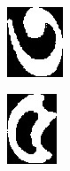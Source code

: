 \begin{figure}
\begin{subfigure}{0.09\textwidth}
    \includegraphics[width=0.9\linewidth]{./img/experiment/stage.17/03-01-00-good}
\end{subfigure}
\begin{subfigure}{0.09\textwidth}
    \centering
    \includegraphics[width=0.9\linewidth]{./img/experiment/stage.17/04-01-00-good}

\end{subfigure}
\end{figure}
